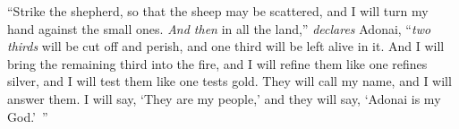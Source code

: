 \begin{biblechapter}
“Strike the shepherd, 
so that the sheep may be scattered, 
and I will turn my hand against the small ones.
\verse \textit{And then} in all the land,” \textit{declares} Adonai, 
“\textit{two thirds} will be cut off and perish, 
and one third will be left alive in it.
\verse And I will bring the remaining third into the fire, 
and I will refine them like one refines silver, 
and I will test them like one tests gold. 
They will call my name, 
and I will answer them. 
I will say, ‘They are my people,’ 
and they will say, ‘Adonai is my God.’ ”
\end{biblechapter}

